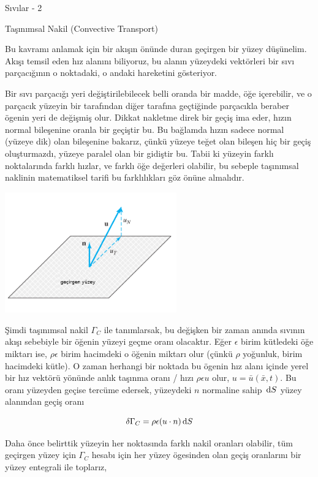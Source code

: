 \documentclass[12pt,fleqn]{article}\usepackage{../../common}
\begin{document}
Sıvılar - 2

Taşınımsal Nakil (Convective Transport)

Bu kavramı anlamak için bir akışın önünde duran geçirgen bir yüzey
düşünelim. Akışı temsil eden hız alanını biliyoruz, bu alanın yüzeydeki
vektörleri bir sıvı parçacığının o noktadaki, o andaki hareketini gösteriyor.

Bir sıvı parçacığı yeri değiştirilebilecek belli oranda bir madde, öğe
içerebilir, ve o parçacık yüzeyin bir tarafından diğer tarafına geçtiğinde
parçacıkla beraber ögenin yeri de değişmiş olur. Dikkat nakletme direk bir
geçiş ima eder, hızın normal bileşenine oranla bir geçiştir bu. Bu bağlamda
hızın sadece normal (yüzeye dik) olan bileşenine bakarız, çünkü yüzeye
teğet olan bileşen hiç bir geçiş oluşturmazdı, yüzeye paralel olan bir
gidiştir bu. Tabii ki yüzeyin farklı noktalarında farklı hızlar, ve farklı
öğe değerleri olabilir, bu sebeple taşınımsal naklinin matematiksel
tarifi bu farklılıkları göz önüne almalıdır. 

\includegraphics[width=20em]{phy_030_fluid2_04.png}

Şimdi taşınımsal nakil $\Gamma_C$ ile tanımlarsak, bu değişken bir zaman anında
sıvının akışı sebebiyle bir öğenin yüzeyi geçme oranı olacaktır. Eğer $\epsilon$
birim kütledeki öğe miktarı ise, $\rho \epsilon$ birim hacimdeki o öğenin
miktarı olur (çünkü $\rho$ yoğunluk, birim hacimdeki kütle). O zaman herhangi
bir noktada bu ögenin hız alanı içinde yerel bir hız vektörü yönünde anlık
taşınma oranı / hızı $\rho \epsilon u$ olur, $u = \bar{u}(\bar{x},t)$. Bu
oranı yüzeyden geçise tercüme edersek, yüzeydeki $n$ normaline sahip $\,\mathrm{d} S$
yüzey alanından geçiş oranı

$$
\delta \Gamma_C = \rho \epsilon (u \cdot n) \,\mathrm{d} S
$$

Daha önce belirttik yüzeyin her noktasında farklı nakil oranları olabilir,
tüm geçirgen yüzey için $\Gamma_C$ hesabı için her yüzey ögesinden olan geçiş
oranlarını bir yüzey entegrali ile toplarız,
\end{document}
